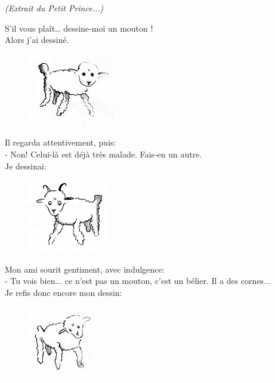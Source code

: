 \textit{(Extrait du Petit Prince...)}

\begin{multicols}{2}
  \og S'il vous plaît… dessine-moi un mouton ! \fg\\
  Alors j'ai dessiné.
  
  \begin{figure}[H]
    \centering
    \includegraphics[width=0.3\linewidth]{5x6-calcul-litteral/mouton2.png}
  \end{figure}

  Il regarda attentivement, puis: \\
  - Non! Celui-là est déjà très malade. Fais-en un autre. \\
  Je dessinai:

  \begin{figure}[H]
    \centering
    \includegraphics[width=0.3\linewidth]{5x6-calcul-litteral/mouton1.png}
  \end{figure}

  Mon ami sourit gentiment, avec indulgence: \\
  - Tu vois bien... ce n'est pas un mouton, c'est un bélier. Il a des cornes... \\
  Je refis donc encore mon dessin:

  \begin{figure}[H]
    \centering
    \includegraphics[width=0.3\linewidth]{5x6-calcul-litteral/mouton3.png}
  \end{figure}
  

\end{multicols}
